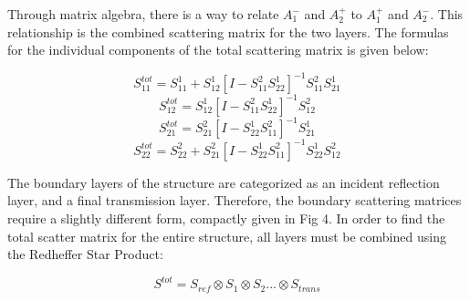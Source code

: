  Through matrix algebra, there is a way to relate $A_1^-$ and $A_2^+$ to $A_1^+$ 
 and $A_2^-$.  This relationship is the combined scattering matrix for the two 
 layers.  The formulas for the individual components of the total scattering 
 matrix is given below:

  \begin{equation}
  S_{11}^{tot} = S_{11}^1 + S_{12}^1[I - S_{11}^2S_{22}^1]^{-1} S_{11}^2S_{21}^1
  \label{eq:19}
  \end{equation}
  \begin{equation}
  S_{12}^{tot} = S_{12}^1[I - S_{11}^2S_{22}^1]^{-1} S_{12}^2
  \label{eq:20}
  \end{equation}
  \begin{equation}
  S_{21}^{tot} = S_{21}^2[I - S_{22}^1S_{11}^2]^{-1} S_{21}^1
  \label{eq:21}
  \end{equation}
  \begin{equation}
  S_{22}^{tot} = S_{22}^2 + S_{21}^2[I - S_{22}^1S_{11}^2]^{-1} S_{22}^1S_{12}^2
  \label{eq:22}
  \end{equation}


 The boundary layers of the structure are categorized as an incident reflection 
 layer, and a final transmission layer.  Therefore, the boundary scattering 
 matrices require a slightly different form, compactly given in Fig 4. %
 In order to find the total scatter matrix for the entire structure, all layers 
 must be combined using the Redheffer Star Product: 

 \begin{equation}
  S^{tot} = S_{ref} \otimes S_1 \otimes S_2 ... \otimes S_{trans}
  \label{eq:23}
  \end{equation}


